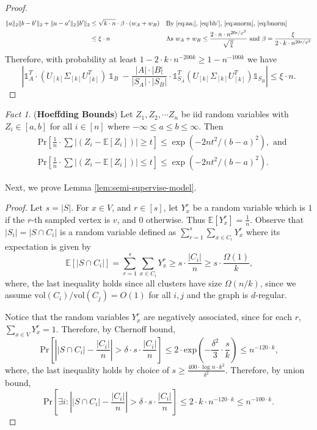 \documentclass[letterpaper,11pt]{article}
\newcommand{\E}{\mathbb{E}}
\theoremstyle{plain}
\theoremstyle{definition}
\theoremstyle{remark}
\newtheorem{fact}{Fact}
\newcommand{\e}{\epsilon}
\newcommand{\vol}{\text{vol}}
\begin{document}
\begin{proof}
\begin{align*}
		\|a\|_2\|b-b'\|_2 + \|a-a'\|_2\|b'\|_2 &\leq  \sqrt{k\cdot n}\cdot \beta\cdot (w_A+w_B) &&\text{By \eqref{eq:aa;}, \eqref{eq:bb'}, \eqref{eq:anorm}, \eqref{eq:bnorm}}  \\
		&\leq \xi\cdot n &&\text{As $w_A+w_B\leq   \frac{2\cdot n\cdot n^{20 \e/\varphi^2}}{\sqrt{\frac{n}{k}}}$ and $\beta = \frac{\xi}{2\cdot k \cdot n^{20 \e/\varphi^2}}$}
	\end{align*}
Therefore, with probability at least $1 - 2\cdot k \cdot n^{-200k} \geq 1 - n^{-100k}$ we have
\[
\left| \mathds{1}_A^T \cdot (U_{[k]}\Sigma_{[k]}U_{[k]}^T) \ 
		\mathds{1}_B \ 
		- \frac{|A|\cdot |B|}{|S_A|\cdot |S_B|} \cdot \mathds{1}_{S_A}^T (U_{[k]}\Sigma_{[k]}U_{[k]}^T) \mathds{1}_{S_B} \right| \leq \xi\cdot n. 
\]
\end{proof}

\begin{fact} \label{fact:hoeffding} (\textbf{Hoeffding Bounds})
	Let $Z_1, Z_2, \cdots Z_n$ be iid random variables with $Z_i \in [a,b]$ for all $i \in [n]$
	where $-\infty \leq a \leq b \leq \infty$. Then
	\begin{align*}
		&\text{Pr} \left[\frac{1}{n} \cdot \sum |(Z_i - \E[Z_i])| \geq t \right] \leq \exp(-2nt^2/(b-a)^2), \text{ and} \\
		&\text{Pr} \left[\frac{1}{n} \cdot \sum |(Z_i - \E[Z_i])| \leq t \right] \leq \exp(-2nt^2/(b-a)^2). 
	\end{align*}
\end{fact}
 
Next, we prove Lemma \ref{lem:semi-supervise-model}.
\lemsemisupevise*
\begin{proof}
Let $s=|S|$. For $x\in V$, and $r \in [s]$, let $Y_x^r$ be a random variable which is $1$ if the $r$-th sampled vertex is $v$, and $0$ otherwise. Thus $\E[Y_x^r]=\frac{1}{n}$. Observe that $|S_i|=|S\cap C_i|$ is a random variable defined as $\sum_{r=1}^s \sum_{x\in C_i} Y_x^r$ where its expectation is given by
\[\E[|S\cap C_i|]=\sum_{r=1}^s \sum_{x\in C_i} Y_x^r \geq s\cdot \frac{|C_i|}{n}\geq s\cdot \frac{\Omega(1)}{k} \text{,}\]
where, the last inequality holds since all clusters have size $\Omega(n/k)$, since we assume $\vol(C_i)/\vol(C_j) = O(1)$ for all $i,j$ and the graph is $d$-regular. 


Notice that the random variables $ Y_x^r$ are negatively associated, since for each $r$, $\sum_{x\in V} Y_x^r=1$. Therefore, by Chernoff bound,
\[
\text{Pr} \left[\left| |S\cap C_i|- \frac{|C_i|}{n}\right| > \delta \cdot s \cdot \frac{|C_i|}{n}\right] \leq 2\cdot \text{exp} \left(- \frac{\delta^2}{3}\cdot \frac{s}{k} \right) \leq n^{-120\cdot k} \text{,}
\]
where, the last inequality holds by choice of $s\geq \frac{400\cdot \log n\cdot k^2}{\delta^2}$. Therefore, by union bound,
\[
\text{Pr} \left[\exists i: \left| |S\cap C_i|- \frac{|C_i|}{n}\right| > \delta \cdot s\cdot \frac{|C_i|}{n}\right] \leq 2\cdot  k\cdot n^{-120\cdot k}\leq n^{-100\cdot k}
\text{.}\]
\end{proof}
\end{document}
